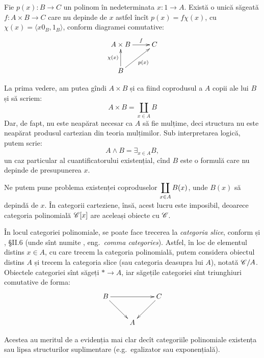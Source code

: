 \documentclass[a4paper]{article}
\begin{document}

Fie $ p(x) : B \to C $ un polinom în nedeterminata $ x : 1 \to A $. Există o unică
săgeată $ f : A \times B \to C $ care nu depinde de $ x $ astfel încît $ p(x) = f\chi(x) $,
cu $ \chi(x) = \langle x0_B, 1_B \rangle $, conform diagramei comutative:
\[
  \xymatrix{
  A \times B \ar[r]^-f & C \\
  B \ar[u]^-{\chi(x)} \ar[ur]_-{p(x)} &
}
\]

\begin{remark}\label{rk:exists}
  La prima vedere, am putea gîndi $ A \times B $ și ca fiind coprodusul a $ A $
  copii ale lui $ B $ și să scriem:
  \[
    A \times B = \coprod_{x \in A} B
  \]
  Dar, de fapt, nu este neapărat necesar ca $ A $ să fie mulțime, deci structura nu este 
  neapărat produsul cartezian din teoria mulțimilor. Sub interpretarea logică, putem scrie:
  \[
    A \land B = \exists_{x \in A} B,
  \]
  un caz particular al cuantificatorului existențial, cînd $ B $ este o formulă care nu
  depinde de presupunerea $ x $.

  Ne putem pune problema existenței coproduselor $ \displaystyle\coprod_{x \in A} B(x) $, unde
  $ B(x) $ să depindă de $ x $. În categorii carteziene, însă, acest lucru este
  imposibil, deoarece categoria polinomială $ \mathscr{C}[x] $ are aceleași obiecte cu $ \mathscr{C} $.
\end{remark}


\begin{remark}\label{rk:slice}
  În locul categoriei polinomiale, se poate face trecerea la \emph{categoria slice},
  conform \cite{joyal} și \cite{macc}, \S II.6 (unde sînt numite ,
  eng.\ \emph{comma categories}).
  Astfel, în loc de elementul distins $ x \in A $, cu care trecem la categoria
  polinomială, putem considera obiectul distins $ A $ și trecem la categoria slice
  (sau categoria deasupra lui $ A $), notată $ \mathscr{C}/A $. Obiectele categoriei
  sînt săgeți $ \ast \to A $, iar săgețile categoriei sînt triunghiuri comutative
  de forma:
  \[
    \xymatrix{
    B \ar[dr] \ar[rr] & & C \ar[dl] \\ & A &
  }
  \]
  
  Acestea au meritul de a evidenția mai clar decît categoriile polinomiale existența sau 
  lipsa structurilor suplimentare (e.g.\ egalizator sau exponențială).
\end{remark}
\end{document}
